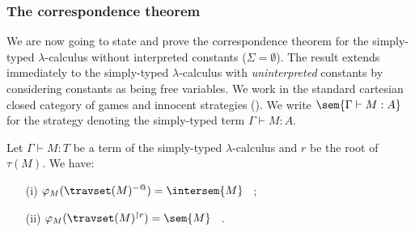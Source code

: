 \subsubsection{The correspondence theorem}
We are now going to state and prove the correspondence theorem for
the simply-typed $\lambda$-calculus without interpreted constants
($\Sigma = \emptyset$). The result extends immediately to the
simply-typed $\lambda$-calculus with \emph{uninterpreted} constants
by considering constants as being free variables. We work in the
standard cartesian closed category of games and innocent strategies
(\cite{abramsky94full, hylandong_pcf}). We write $\sem{\Gamma \vdash
M : A}$ for the strategy denoting the simply-typed term $\Gamma
\vdash M : A$.

\begin{prop}
\label{prop:rel_gamesem_trav} Let $\Gamma \vdash M : T$ be a term of
the simply-typed $\lambda$-calculus and $r$ be the root of
$\tau(M)$. We have:
\begin{itemize}
\item[(i)]  $\varphi_M(\travset(M)^{-@}) = \intersem{M}$ \ ;
\item[(ii)] $\varphi_M(\travset(M)^{\upharpoonright r}) = \sem{M}$ \ .
\end{itemize}
\end{prop}


